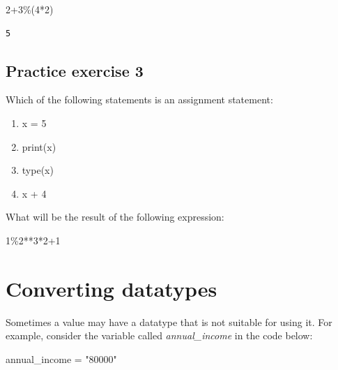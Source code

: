 \documentclass[
  letterpaper,
  DIV=11,
  numbers=noendperiod]{scrreprt}
\newenvironment{Shaded}{\begin{snugshade}}{\end{snugshade}}
\newcommand{\DecValTok}[1]{\textcolor[rgb]{0.68,0.00,0.00}{#1}}
\newcommand{\NormalTok}[1]{\textcolor[rgb]{0.00,0.23,0.31}{#1}}
\newcommand{\OperatorTok}[1]{\textcolor[rgb]{0.37,0.37,0.37}{#1}}
\newcommand{\StringTok}[1]{\textcolor[rgb]{0.13,0.47,0.30}{#1}}
\begin{document}
\begin{Shaded}
\begin{Highlighting}[]
\DecValTok{2}\OperatorTok{+}\DecValTok{3}\OperatorTok{\%}\NormalTok{(}\DecValTok{4}\OperatorTok{*}\DecValTok{2}\NormalTok{)}
\end{Highlighting}
\end{Shaded}

\begin{verbatim}
5
\end{verbatim}

\hypertarget{practice-exercise-3}{%
\subsection{Practice exercise 3}\label{practice-exercise-3}}

Which of the following statements is an assignment statement:

\begin{enumerate}
\def\labelenumi{\arabic{enumi}.}
\item
  x = 5
\item
  print(x)
\item
  type(x)
\item
  x + 4
\end{enumerate}

What will be the result of the following expression:

\begin{Shaded}
\begin{Highlighting}[]
\DecValTok{1}\OperatorTok{\%}\DecValTok{2}\OperatorTok{**}\DecValTok{3}\OperatorTok{*}\DecValTok{2}\OperatorTok{+}\DecValTok{1}
\end{Highlighting}
\end{Shaded}

\hypertarget{converting-datatypes}{%
\section{Converting datatypes}\label{converting-datatypes}}

Sometimes a value may have a datatype that is not suitable for using it.
For example, consider the variable called \emph{annual\_income} in the
code below:

\begin{Shaded}
\begin{Highlighting}[]
\NormalTok{annual\_income }\OperatorTok{=} \StringTok{"80000"}
\end{Highlighting}
\end{Shaded}
\end{document}
